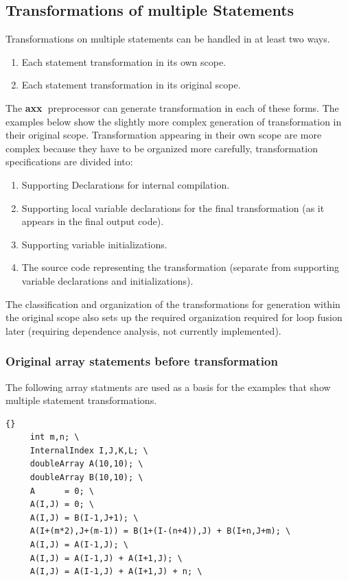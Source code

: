 \documentclass[10pt]{article}
\newcommand{\axx}{{\bf axx\ }}
\begin{document}
\subsection{Transformations of multiple Statements}

    Transformations on multiple statements can be handled in at least two ways.
\begin{enumerate}
   \item Each statement transformation in its own scope.
   \item Each statement transformation in its original scope.
\end{enumerate}

   The \axx preprocessor can generate transformation in each of these forms.  The examples below
show the slightly more complex generation of transformation in their original scope.  Transformation
appearing in their own scope are more complex because they have to be organized more carefully,
transformation specifications are divided into:
\begin{enumerate}
   \item Supporting Declarations for internal compilation.

   \item Supporting local variable declarations for the final transformation (as it appears in the
   final output code).

   \item Supporting variable initializations.

   \item The source code representing the transformation (separate from supporting variable
   declarations and initializations).
\end{enumerate}

The classification and organization of the transformations for generation within the original scope
also sets up the required organization required for loop fusion later (requiring dependence
analysis, not currently implemented).

\subsubsection{Original array statements before transformation}

The following array statments are used as a basis for the examples that show multiple statement
transformations.

\begin{lstlisting}{}
     int m,n; \
     InternalIndex I,J,K,L; \
     doubleArray A(10,10); \
     doubleArray B(10,10); \
     A      = 0; \
     A(I,J) = 0; \
     A(I,J) = B(I-1,J+1); \
     A(I+(m*2),J+(m-1)) = B(1+(I-(n+4)),J) + B(I+n,J+m); \
     A(I,J) = A(I-1,J); \
     A(I,J) = A(I-1,J) + A(I+1,J); \
     A(I,J) = A(I-1,J) + A(I+1,J) + n; \

\end{lstlisting}
\end{document}
